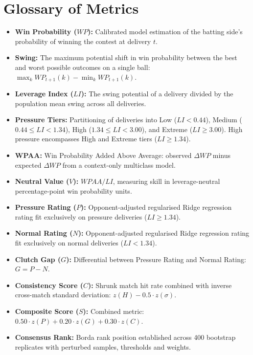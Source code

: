 \documentclass[11pt,a4paper]{article}
\begin{document}
\section{Glossary of Metrics}
\label{app:glossary}
\begin{itemize}
    \item \textbf{Win Probability ($WP$):} Calibrated model estimation of the batting side's probability of winning the contest at delivery $t$.
    \item \textbf{Swing:} The maximum potential shift in win probability between the best and worst possible outcomes on a single ball: $\max_k WP_{t+1}(k) - \min_k WP_{t+1}(k)$.
    \item \textbf{Leverage Index ($LI$):} The swing potential of a delivery divided by the population mean swing across all deliveries.
    \item \textbf{Pressure Tiers:} Partitioning of deliveries into Low ($LI < 0.44$), Medium ($0.44 \le LI < 1.34$), High ($1.34 \le LI < 3.00$), and Extreme ($LI \ge 3.00$). High pressure encompasses High and Extreme tiers ($LI \ge 1.34$).
    \item \textbf{WPAA:} Win Probability Added Above Average: observed $\Delta WP$ minus expected $\Delta WP$ from a context-only multiclass model.
    \item \textbf{Neutral Value ($V$):} $WPAA / LI$, measuring skill in leverage-neutral percentage-point win probability units.
    \item \textbf{Pressure Rating ($P$):} Opponent-adjusted regularised Ridge regression rating fit exclusively on pressure deliveries ($LI \ge 1.34$).
    \item \textbf{Normal Rating ($N$):} Opponent-adjusted regularised Ridge regression rating fit exclusively on normal deliveries ($LI < 1.34$).
    \item \textbf{Clutch Gap ($G$):} Differential between Pressure Rating and Normal Rating: $G = P - N$.
    \item \textbf{Consistency Score ($C$):} Shrunk match hit rate combined with inverse cross-match standard deviation: $z(H) - 0.5 \cdot z(\sigma)$.
    \item \textbf{Composite Score ($S$):} Combined metric: $0.50 \cdot z(P) + 0.20 \cdot z(G) + 0.30 \cdot z(C)$.
    \item \textbf{Consensus Rank:} Borda rank position established across 400 bootstrap replicates with perturbed samples, thresholds and weights.
\end{itemize}
\end{document}
